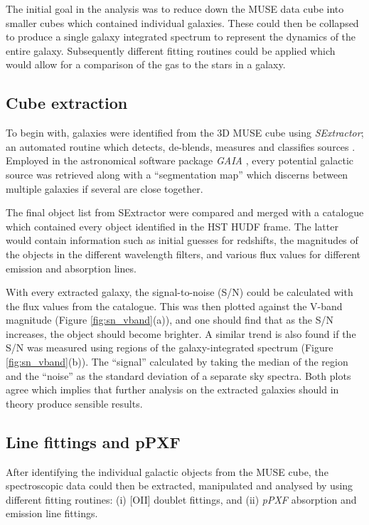 \documentclass[12pt, twocolumn]{revtex4-1}    %
\begin{document}
The initial goal in the analysis was to reduce down the MUSE data cube into smaller cubes which contained individual galaxies. These could then be collapsed to produce a single galaxy integrated spectrum to represent the dynamics of the entire galaxy. Subsequently different fitting routines could be applied which would allow for a comparison of the gas to the stars in a galaxy.

\subsection*{Cube extraction}

To begin with, galaxies were identified from the 3D MUSE cube using \textit{SExtractor}; an automated routine which detects, de-blends, measures and classifies sources \citep{bertin_sextractor}. Employed in the astronomical software package \textit{GAIA} \citep{currie_starlink}, every potential galactic source was retrieved along with a ``segmentation map'' which discerns between multiple galaxies if several are close together. 

The final object list from SExtractor were compared and merged with a catalogue which contained every object identified in the HST HUDF frame. The latter would contain information such as initial guesses for redshifts, the magnitudes of the objects in the different wavelength filters, and various flux values for different emission and absorption lines.


With every extracted galaxy, the signal-to-noise (S/N) could be calculated with the flux values from the catalogue. This was then plotted against the V-band magnitude (Figure \ref{fig:sn_vband}(a)), and one should find that as the S/N increases, the object should become brighter. A similar trend is also found if the S/N was measured using regions of the galaxy-integrated spectrum (Figure \ref{fig:sn_vband}(b)). The ``signal'' calculated by taking the median of the region and the ``noise'' as the standard deviation of a separate sky spectra. Both plots agree which implies that further analysis on the extracted galaxies should in theory produce sensible results. 

\subsection*{Line fittings and pPXF} 

After identifying the individual galactic objects from the MUSE cube, the spectroscopic data could then be extracted, manipulated and analysed by using different fitting routines: (i) [OII] doublet fittings, and (ii) \textit{pPXF} absorption and emission line fittings.
\end{document}
